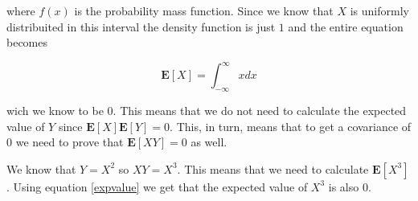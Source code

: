 \documentclass{article}
\begin{document}
where $f(x)$ is the probability mass function. Since we know that $X$ is
uniformly distribuited in this interval the density function is just $1$ and
the entire equation becomes

\begin{equation}
  \mathbf{E}[X] = \int_{-\infty}^{\infty} x dx
\end{equation}

wich we know to be $0$. This means that we do not need to calculate the
expected value of $Y$ since $\mathbf{E}[X]\mathbf{E}[Y] = 0$. This, in turn,
means that to get a covariance of $0$ we need to prove that $\mathbf{E}[XY] =
0$ as well.

We know that $Y = X^2$ so $XY = X^3$. This means that we need to calculate
$\mathbf{E}[X^3]$. Using equation \ref{expvalue} we get that the expected value
of $X^3$ is also $0$.
\end{document}
